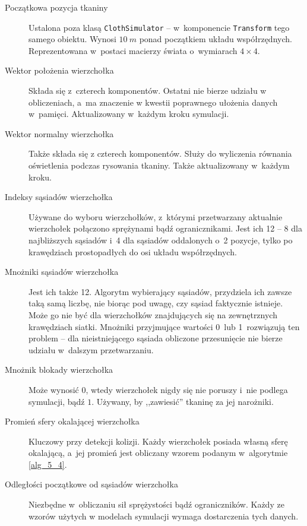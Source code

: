 			\begin{description}
				
				\item[Początkowa pozycja tkaniny] Ustalona poza klasą \texttt{ClothSimulator} -- w~komponencie \texttt{Transform} tego samego obiektu. Wynosi \(10\ m\) ponad początkiem układu współrzędnych. Reprezentowana w~postaci macierzy świata o~wymiarach \(4\times4 \).
				
				\item[Wektor położenia wierzchołka] Składa się z~czterech komponentów. Ostatni nie bierze udziału w obliczeniach, a~ma znaczenie w kwestii poprawnego ułożenia danych w~pamięci. Aktualizowany w~każdym kroku symulacji.
				
				\item[Wektor normalny wierzchołka] Także składa się z czterech komponentów. Służy do wyliczenia równania oświetlenia podczas rysowania tkaniny. Także aktualizowany w~każdym kroku.
				
				\item[Indeksy sąsiadów wierzchołka] Używane do wyboru wierzchołków, z~którymi przetwarzany aktualnie wierzchołek połączono sprężynami bądź ogranicznikami. Jest ich 12 -- 8 dla najbliższych sąsiadów i~4 dla sąsiadów oddalonych o~2 pozycje, tylko po krawędziach prostopadłych do osi układu współrzędnych. 
				
				\item[Mnożniki sąsiadów wierzchołka] Jest ich także 12. Algorytm wybierający sąsiadów, przydziela ich zawsze taką samą liczbę, nie biorąc pod uwagę, czy sąsiad faktycznie istnieje. Może go nie być dla wierzchołków znajdujących się na zewnętrznych krawędziach siatki. Mnożniki przyjmujące wartości 0~lub 1~rozwiązują ten problem -- dla nieistniejącego sąsiada obliczone przesunięcie nie bierze udziału w~dalszym przetwarzaniu.
				
				\item[Mnożnik blokady wierzchołka] Może wynosić \(0\), wtedy wierzchołek nigdy się nie poruszy i~nie podlega symulacji, bądź \(1\). Używany, by ,,zawiesić'' tkaninę za jej narożniki.
				
				\item[Promień sfery okalającej wierzchołka] Kluczowy przy detekcji kolizji. Każdy wierzchołek posiada własną sferę okalającą, a~jej promień jest obliczany wzorem podanym w~algorytmie \ref{alg_5_4}.
				
				\item[Odległości początkowe od sąsiadów wierzchołka] Niezbędne w~obliczaniu sił sprężystości bądź ograniczników. Każdy ze wzorów użytych w modelach symulacji wymaga dostarczenia tych danych.
				
			\end{description}
			

